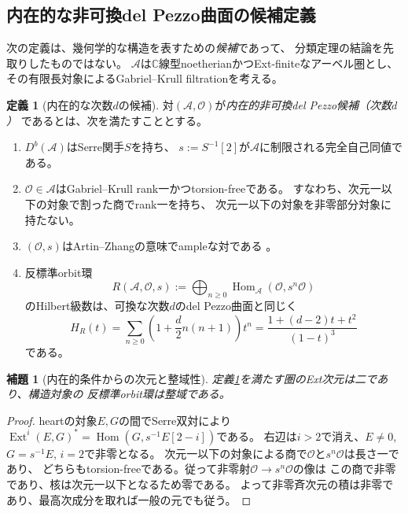 \documentclass[11pt,a4paper]{ltjsarticle}
\newtheorem{lemma}[theorem]{補題}
\theoremstyle{definition}
\newtheorem{definition}[theorem]{定義}
\begin{document}
\subsection{内在的な非可換del Pezzo曲面の候補定義}

次の定義は、幾何学的な構造を表すための\emph{候補}であって、
分類定理の結論を先取りしたものではない。
$\mathcal A$は$\mathbb C$線型noetherianかつExt-finiteなアーベル圏とし、
その有限長対象によるGabriel--Krull filtrationを考える。

\begin{definition}[内在的な次数$d$の候補]\label{def:intrinsic-dp}
対$(\mathcal A,\mathcal O)$が\emph{内在的非可換del Pezzo候補（次数$d$）}
であるとは、次を満たすこととする。
\begin{enumerate}[label=(\roman*)]
\item $D^b(\mathcal A)$はSerre関手$S$を持ち、
$s:=S^{-1}[2]$が$\mathcal A$に制限される完全自己同値である。
\item $\mathcal O\in\mathcal A$はGabriel--Krull rank一かつtorsion-freeである。
すなわち、次元一以下の対象で割った商でrank一を持ち、
次元一以下の対象を非零部分対象に持たない。
\item $(\mathcal O,s)$はArtin--Zhangの意味でampleな対である
\cite{AZ1994}。
\item 反標準orbit環
\[
 R(\mathcal A,\mathcal O,s)
 :=\bigoplus_{n\geq0}\operatorname{Hom}_{\mathcal A}
       (\mathcal O,s^n\mathcal O)
\]
のHilbert級数は、可換な次数$d$のdel Pezzo曲面と同じく
\begin{equation}\label{eq:intrinsic-hilbert}
 H_R(t)=\sum_{n\geq0}\left(1+\frac d2n(n+1)\right)t^n
 =\frac{1+(d-2)t+t^2}{(1-t)^3}
\end{equation}
である。
\end{enumerate}
\end{definition}

\begin{lemma}[内在的条件からの次元と整域性]
\label{lem:intrinsic-domain-dimension}
定義\ref{def:intrinsic-dp}を満たす圏のExt次元は二であり、構造対象の
反標準orbit環は整域である。
\end{lemma}
\begin{proof}
heartの対象$E,G$の間でSerre双対により
$\operatorname{Ext}^i(E,G)^*=\operatorname{Hom}(G,s^{-1}E[2-i])$である。
右辺は$i>2$で消え、$E\ne0$, $G=s^{-1}E$, $i=2$で非零となる。
次元一以下の対象による商で$\mathcal O$と$s^n\mathcal O$は長さ一であり、
どちらもtorsion-freeである。従って非零射$\mathcal O\to s^n\mathcal O$の像は
この商で非零であり、核は次元一以下となるため零である。
よって非零斉次元の積は非零であり、最高次成分を取れば一般の元でも従う。
\end{proof}
\end{document}

